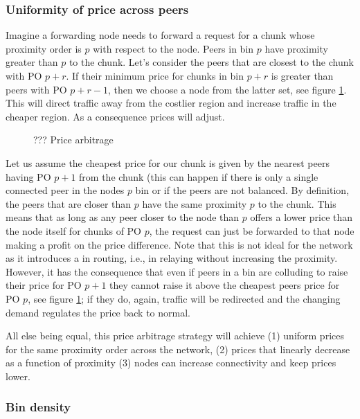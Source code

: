 \subsubsection{Uniformity of price across peers}

Imagine a forwarding node needs to forward a request for a chunk whose proximity order is $p$ with respect to the node. 
Peers in bin $p$ have proximity greater than $p$ to the chunk. Let's consider the peers that are closest to the chunk with PO $p+r$. If their minimum price for chunks in bin $p+r$ is greater than peers with PO $p+r-1$, then we choose a node from the latter set, see figure  \ref{fig:price-arbitrage}. This will direct traffic away from the costlier region and increase traffic in the cheaper region. As a consequence prices will adjust. 

\begin{figure}[htbp]
   \centering
   \caption[??? Price arbitrage]{??? Price arbitrage}
   \label{fig:price-arbitrage}
\end{figure}

Let us assume the cheapest price for our chunk is given by the nearest peers having PO $p+1$ from the chunk (this can happen if there is only a single connected peer in the nodes $p$ bin or if the peers are not  balanced. By definition, the peers that are closer than $p$ have the same proximity $p$ to the chunk. This means that as long as any peer closer to the node than $p$ offers a lower price than the node itself for chunks of PO $p$, the request can just be forwarded to that node making a profit on the price difference. Note that this is not ideal for the network as it introduces a  in routing, i.e., in relaying without increasing the proximity. However, it has the consequence that even if peers in a bin are colluding to raise their price for PO $p+1$ they cannot raise it above the cheapest peers price for PO $p$, see figure  \ref{fig:price-arbitrage}; if they do, again, traffic will be redirected and the changing demand regulates the price back to normal. 

All else being equal, this price arbitrage strategy will achieve (1) uniform prices for the same proximity order across the network, (2) prices that linearly decrease as a function of proximity (3) nodes can increase connectivity and keep prices lower.


\subsubsection{Bin density}

